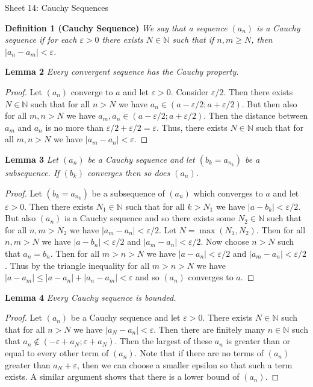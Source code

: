 \documentclass{article}
\begin{document}
\begin{flushleft}

\Large

Sheet 14: Cauchy Sequences\newline

\normalsize

\textbf{Definition 1 (Cauchy Sequence)}
\textsl{We say that a sequence $(a_n)$ is a Cauchy sequence if for each $\varepsilon > 0$ there exists $N \in \mathbb{N}$ such that if $n,m \geq N$, then $|a_n-a_m| < \varepsilon$.}\newline

\textbf{Lemma 2}
\textsl{Every convergent sequence has the Cauchy property.}
\begin{proof}
Let $(a_n)$ converge to $a$ and let $\varepsilon > 0$. Consider $\varepsilon/2$. Then there exists $N \in \mathbb{N}$ such that for all $n>N$ we have $a_n \in (a - \varepsilon/2 ; a + \varepsilon/2)$. But then also for all $m,n > N$ we have $a_m, a_n \in (a - \varepsilon/2 ; a + \varepsilon/2)$. Then the distance between $a_m$ and $a_n$ is no more than $\varepsilon / 2 + \varepsilon /2 = \varepsilon$. Thus, there exists $N \in \mathbb{N}$ such that for all $m,n > N$ we have $|a_m-a_n| < \varepsilon$.
\end{proof}

\textbf{Lemma 3}
\textsl{Let $(a_n)$ be a Cauchy sequence and let $(b_k = a_{n_k})$ be a subsequence. If $(b_k)$ converges then so does $(a_n)$.}
\begin{proof}
Let $(b_k = a_{n_k})$ be a subsequence of $(a_n)$ which converges to $a$ and let $\varepsilon > 0$. Then there exists $N_1 \in \mathbb{N}$ such that for all $k > N_1$ we have $|a-b_k| < \varepsilon/2$. But also $(a_n)$ is a Cauchy sequence and so there exists some $N_2 \in \mathbb{N}$ such that for all $n,m > N_2$ we have $|a_m - a_n| < \varepsilon/2$. Let $N = \max (N_1,N_2)$. Then for all $n,m > N$ we have $|a-b_n| < \varepsilon/2$ and $|a_m - a_n| < \varepsilon/2$. Now choose $n>N$ such that $a_n = b_n$. Then for all $m > n > N$ we have $|a-a_n| < \varepsilon/2$ and $|a_m - a_n| < \varepsilon/2$. Thus by the triangle inequality for all $m>n>N$ we have $|a - a_m| \leq |a - a_n| + |a_n - a_m| < \varepsilon$ and so $(a_n)$ converges to $a$.
\end{proof}

\textbf{Lemma 4}
\textsl{Every Cauchy sequence is bounded.}
\begin{proof}
Let $(a_n)$ be a Cauchy sequence and let $\varepsilon > 0$. There exists $N \in \mathbb{N}$ such that for all $n > N$ we have $|a_N - a_n| < \varepsilon$. Then there are finitely many $n \in \mathbb{N}$ such that $a_n \notin (-\varepsilon + a_N ; \varepsilon + a_N)$. Then the largest of these $a_n$ is greater than or equal to every other term of $(a_n)$. Note that if there are no terms of $(a_n)$ greater than $a_N + \varepsilon$, then we can choose a smaller epsilon so that such a term exists. A similar argument shows that there is a lower bound of $(a_n)$.
\end{proof}


\end{flushleft}
\end{document}
